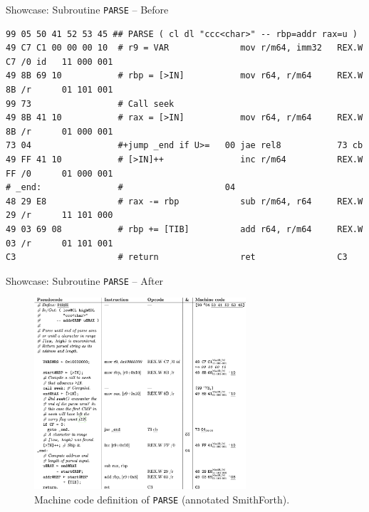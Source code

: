 \documentclass[presentation, bigger]{beamer}
\begin{document}
\begin{frame}[label={sec:orge2d80bd},fragile]{Showcase: Subroutine \texttt{PARSE} -- Before}
 \fontsize{7ptpt}{8.400000pt}\selectfont
\begin{verbatim}
99 05 50 41 52 53 45 ## PARSE ( cl dl "ccc<char>" -- rbp=addr rax=u )
49 C7 C1 00 00 00 10  # r9 = VAR              mov r/m64, imm32   REX.W C7 /0 id   11 000 001
49 8B 69 10           # rbp = [>IN]           mov r64, r/m64     REX.W 8B /r      01 101 001
99 73                 # Call seek				        		      
49 8B 41 10           # rax = [>IN]           mov r64, r/m64     REX.W 8B /r      01 000 001
73 04                 #+jump _end if U>=   00 jae rel8           73 cb	      
49 FF 41 10           # [>IN]++               inc r/m64          REX.W FF /0      01 000 001
# _end:               #                    04		        		      
48 29 E8              # rax -= rbp            sub r/m64, r64     REX.W 29 /r      11 101 000
49 03 69 08           # rbp += [TIB]          add r64, r/m64     REX.W 03 /r      01 101 001
C3                    # return                ret                C3    
\end{verbatim}
\normalsize
\end{frame}

\begin{frame}[label={sec:org3ae3e4b},fragile]{Showcase: Subroutine \texttt{PARSE} -- After}
 \begin{figure}[htbp]
\centering
\includegraphics[width=0.70\textwidth]{img/presentation/PARSE-annotated.png}
\caption{Machine code definition of \texttt{PARSE} (annotated SmithForth).}
\end{figure}
\end{frame}
\end{document}
